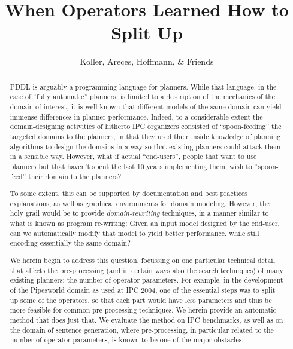 \documentclass{llncs}
\title{When Operators Learned How to Split Up}
\author{Koller, Areces, Hoffmann, \& Friends}
\institute{I'm sure they're working somewhere \dots}
\begin{document}
\maketitle


\begin{abstract}
PDDL is arguably a programming language for planners. While that
language, in the case of ``fully automatic'' planners, is limited to a
description of the mechanics of the domain of interest, it is
well-known that different models of the same domain can yield immense
differences in planner performance. Indeed, to a considerable extent
the domain-designing activities of hitherto IPC organizers consisted
of ``spoon-feeding'' the targeted domains to the planners, in that
they used their inside knowledge of planning algorithms to design the
domains in a way so that existing planners could attack them in a
sensible way. However, what if actual ``end-users'', people that want
to use planners but that haven't spent the last 10 years implementing
them, wish to ``spoon-feed'' their domain to the planners?

To some extent, this can be supported by documentation and best
practices explanations, as well as graphical environments for domain
modeling. However, the holy grail would be to provide
\emph{domain-rewriting} techniques, in a manner similar to what is
known as program re-writing: Given an input model designed by the
end-user, can we automatically modify that model to yield better
performance, while still encoding essentially the same domain?

We herein begin to address this question, focussing on one particular
technical detail that affects the pre-processing (and in certain ways
also the search techniques) of many existing planners: the number of
operator parameters. For example, in the development of the Pipesworld
domain as used at IPC 2004, one of the essential steps was to split up
some of the operators, so that each part would have less parameters
and thus be more feasible for common pre-processing techniques. We
herein provide an automatic method that does just that. We evaluate
the method on IPC benchmarks, as well as on the domain of sentence
generation, where pre-processing, in particular related to the number
of operator parameters, is known to be one of the major obstacles.
\end{abstract}













\end{document}
